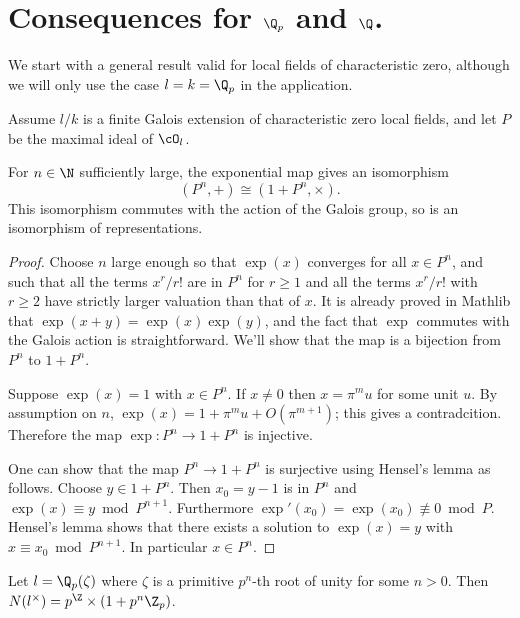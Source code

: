 \section{Consequences for $\Q_p$ and $\Q$.}

We start with a general result valid for local fields of characteristic zero, although
we will only use the case $l=k=\Q_p$ in the application.

\begin{lemma}\label{lem:local isomorphism}
	Assume $l/k$ is a finite Galois extension of characteristic zero local fields, and let $P$ be the maximal
	ideal of $\cO_l$.

	For $n \in \N$ sufficiently large, the
	exponential map gives an isomorphism
	\[
		(P^n,+) \cong (1 + P^n, \times).
	\]
	This isomorphism commutes with the action of the Galois group, so is an
	isomorphism of representations.
\end{lemma}

\begin{proof}
	Choose $n$ large enough so that $\exp(x)$ converges for all $x \in P^n$,
	and such that all the terms $x^r/r!$ are in $P^n$ for $r \ge 1$
	and all the terms $x^r / r!$ with $r \ge 2$ have strictly larger valuation than that of $x$.
	It is already proved in Mathlib that $\exp(x+y)=\exp(x)\exp(y)$, and the fact that $\exp$ commutes
	with the Galois action is straightforward.
	We'll show that the map is a bijection from $P^n$ to $1+P^n$.

	Suppose $\exp(x)=1$ with $x \in P^n$.
	If $x \ne 0$ then $x = \pi^mu$ for some unit $u$.
	By assumption on $n$, $\exp(x) = 1 + \pi^m u + O(\pi^{m+1})$; this gives a contradcition.
	Therefore the map $\exp : P^n \to 1+P^n$ is injective.

	One can show that the map $P^n \to 1+P^n$ is surjective using Hensel's lemma as follows.
	Choose $y \in 1+P^n$. Then $x_0 = y-1$ is in $P^n$ and $\exp(x) \equiv y \bmod P^{n+1}$.
	Furthermore $\exp'(x_0) = \exp(x_0) \not\equiv 0 \bmod P$. Hensel's lemma shows that there exists
	a solution to $\exp(x)=y$ with $x \equiv x_0 \bmod P^{n+1}$.
	In particular $x \in P^n$.
\end{proof}

\begin{lemma} \label{lem:local cyclotomic norms}
	Let $l = \Q_p(\zeta)$ where $\zeta$ is a primitive $p^n$-th root of unity
	for some $n > 0$.
	Then $N(l^\times) = p^\Z \times (1+p^n \Z_p)$.
\end{lemma}

